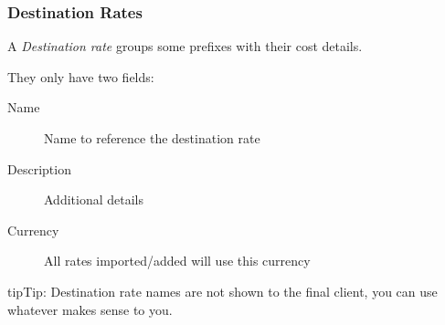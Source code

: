 \documentclass[letterpaper,10pt,english]{sphinxmanual}
\begin{document}
\subsubsection{Destination Rates}
\label{administration_portal/brand/billing/destination_rates:destination-rates}\label{administration_portal/brand/billing/destination_rates::doc}\label{administration_portal/brand/billing/destination_rates:destination-rate}
A \emph{Destination rate} groups some prefixes with their cost details.

They only have two fields:
\begin{description}
\item[{Name}] \leavevmode{}\label{administration_portal/brand/billing/destination_rates:term-name}
Name to reference the destination rate

\item[{Description}] \leavevmode{}\label{administration_portal/brand/billing/destination_rates:term-description}
Additional details

\item[{Currency}] \leavevmode{}\label{administration_portal/brand/billing/destination_rates:term-currency}
All rates imported/added will use this currency

\end{description}

\begin{notice}{tip}{Tip:}
Destination rate names are not shown to the final client, you can use whatever makes sense to you.
\end{notice}
\end{document}
